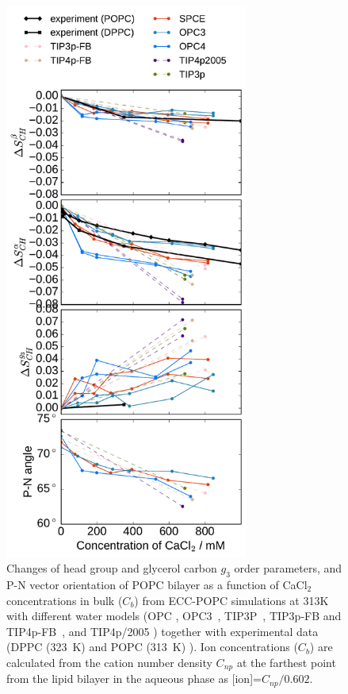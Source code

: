 \documentclass[journal=jpcbfk]{achemso}
\begin{document}
\begin{figure}[!hp]
  \centering
  \includegraphics[width=8.0cm]{../Fig/ipython_nb/PN_angle_OrdPars-A-B-g3_L14-ECCL17_q80_sig89_CaCl_waterModels.pdf}
  \caption{\label{fig:ordPars_waterModels}
    Changes of head group and glycerol carbon $g_3$ order parameters, and P-N vector orientation of POPC bilayer
    as a function of CaCl$_2$ concentrations in bulk ($C_b$) from ECC-POPC simulations at 313K with different
    water models (OPC \cite{Izadi14}, OPC3~\cite{Izadi16}, TIP3P~\cite{jorgensen83}, TIP3p-FB and TIP4p-FB~\cite{Wang2014}, and TIP4p/2005 \cite{Abascal2005})
    together with experimental data (DPPC (323~K) \cite{akutsu81} and POPC (313~K) \cite{altenbach84}). 
    Ion concentrations ($C_b$) are calculated from the cation number density $C_{np}$
    at the farthest point from the lipid bilayer in the aqueous phase as [ion]=$C_{np}/0.602$.
  }
\end{figure}
\end{document}
